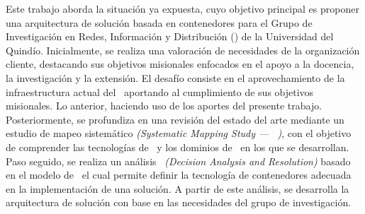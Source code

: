Este trabajo aborda la situación ya expuesta, cuyo objetivo principal es proponer una arquitectura de solución basada en contenedores para el Grupo de Investigación en Redes, Información y Distribución (\GRID) de la Universidad del Quindío. Inicialmente, se realiza una valoración de necesidades de la organización cliente, destacando sus objetivos misionales enfocados en el apoyo a la docencia, la investigación y la extensión. El desafío consiste en el aprovechamiento de la infraestructura actual del \GRID\ aportando al cumplimiento de sus objetivos misionales. Lo anterior, haciendo uso de los aportes del presente trabajo. Posteriormente, se profundiza en una revisión del estado del arte mediante un estudio de mapeo sistemático \textit{(Systematic Mapping Study --- \SMS\ )}, con el objetivo de comprender las tecnologías de \VBC\ y los dominios de \TI\ en los que se desarrollan. Paso seguido, se realiza un análisis \DAR\ \textit{(Decision Analysis and Resolution)} basado en el modelo de \CMMI\, el cual permite definir la tecnología de contenedores adecuada
en la implementación de una solución. A partir de este análisis, se desarrolla la arquitectura de solución con base en las necesidades del grupo de investigación.
